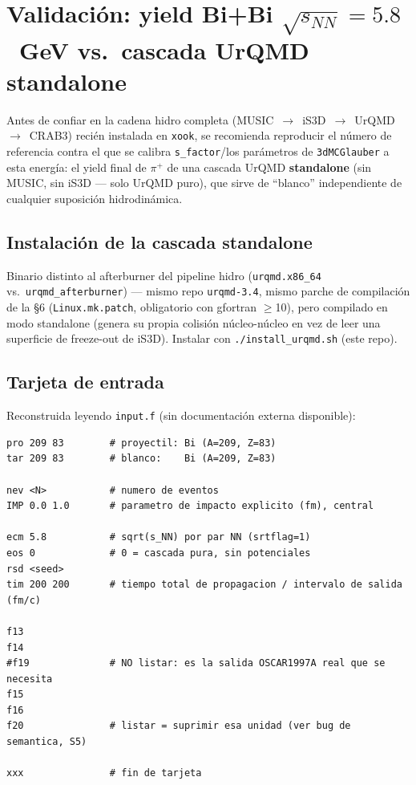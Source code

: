 \documentclass[11pt]{article}
\begin{document}
\section{Validación: yield Bi+Bi $\sqrt{s_{NN}}=5.8$~GeV vs.\ cascada UrQMD standalone}
\label{sec:validacion}

Antes de confiar en la cadena hidro completa (MUSIC~$\to$~iS3D~$\to$~UrQMD~
$\to$~CRAB3) recién instalada en \texttt{xook}, se recomienda reproducir el
número de referencia contra el que se calibra \texttt{s\_factor}/los
parámetros de \texttt{3dMCGlauber} a esta energía: el yield final de
$\pi^+$ de una cascada UrQMD \textbf{standalone} (sin MUSIC, sin iS3D ---
solo UrQMD puro), que sirve de ``blanco'' independiente de cualquier
suposición hidrodinámica.

\subsection{Instalación de la cascada standalone}

Binario distinto al afterburner del pipeline hidro (\texttt{urqmd.x86\_64}
vs.\ \texttt{urqmd\_afterburner}) --- mismo repo \texttt{urqmd-3.4}, mismo
parche de compilación de la \S6 (\texttt{Linux.mk.patch}, obligatorio con
gfortran $\ge$10), pero compilado en modo standalone (genera su propia
colisión núcleo-núcleo en vez de leer una superficie de freeze-out de
iS3D). Instalar con \texttt{./install\_urqmd.sh} (este repo).

\subsection{Tarjeta de entrada}

Reconstruida leyendo \texttt{input.f} (sin documentación externa
disponible):

\begin{Verbatim}[fontsize=\small]
pro 209 83        # proyectil: Bi (A=209, Z=83)
tar 209 83        # blanco:    Bi (A=209, Z=83)

nev <N>           # numero de eventos
IMP 0.0 1.0       # parametro de impacto explicito (fm), central

ecm 5.8           # sqrt(s_NN) por par NN (srtflag=1)
eos 0             # 0 = cascada pura, sin potenciales
rsd <seed>
tim 200 200       # tiempo total de propagacion / intervalo de salida (fm/c)

f13
f14
#f19              # NO listar: es la salida OSCAR1997A real que se necesita
f15
f16
f20               # listar = suprimir esa unidad (ver bug de semantica, S5)

xxx               # fin de tarjeta
\end{Verbatim}
\end{document}
